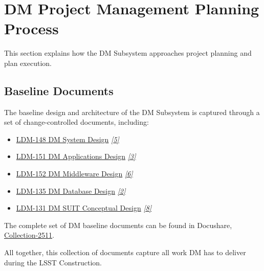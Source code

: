 \documentclass[DM,toc,obsolete]{lsstdoc}
\newcommand{\sphinxcrossref}[1]{\emph{#1}}
\begin{document}
\section{DM Project Management Planning Process}
\label{\detokenize{index:dm-project-management-planning-process}}\label{\detokenize{index:baseline-plan}}
This section explains how the DM Subsystem approaches project planning and plan execution.


\subsection{Baseline Documents}
\label{\detokenize{index:baseline-documents}}
The baseline design and architecture of the DM Subsystem is captured through a set of change-controlled
documents, including:
\begin{itemize}
\item {}
\href{https://ls.st/LDM-148}{LDM-148 DM System Design} \label{\detokenize{index:id4}}{\hyperref[\detokenize{index:ldm-148}]{\sphinxcrossref{{[}5{]}}}}

\item {}
\href{https://ls.st/LDM-151}{LDM-151 DM Applications Design} \label{\detokenize{index:id5}}{\hyperref[\detokenize{index:ldm-151}]{\sphinxcrossref{{[}3{]}}}}

\item {}
\href{https://ls.st/LDM-152}{LDM-152 DM Middleware Design} \label{\detokenize{index:id6}}{\hyperref[\detokenize{index:ldm-152}]{\sphinxcrossref{{[}6{]}}}}

\item {}
\href{https://ls.st/LDM-135}{LDM-135 DM Database Design} \label{\detokenize{index:id7}}{\hyperref[\detokenize{index:ldm-135}]{\sphinxcrossref{{[}2{]}}}}

\item {}
\href{https://ls.st/LDM-131}{LDM-131 DM SUIT Conceptual Design} \label{\detokenize{index:id8}}{\hyperref[\detokenize{index:ldm-131}]{\sphinxcrossref{{[}8{]}}}}

\end{itemize}

The complete set of DM baseline documents can be found in Docushare, \href{https://ls.st/Collection-2511}{Collection-2511}.

All together, this collection of documents capture all work DM has to deliver during the LSST Construction.
\end{document}
